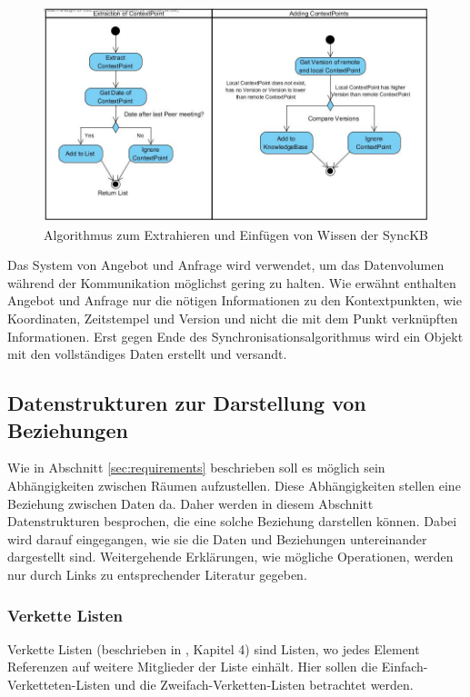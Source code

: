 \documentclass[a4paper]{article}
\begin{document}
	\begin{figure}[H] 
		\includegraphics[width=\linewidth]{../Bilder/sync_flow.jpg}
		\caption{Algorithmus zum Extrahieren und Einfügen von Wissen der SyncKB}
		\label{fig:SyncFlow}
	\end{figure}
	
	Das System von Angebot und Anfrage wird verwendet, um das Datenvolumen während
	der Kommunikation möglichst gering zu halten. Wie erwähnt enthalten Angebot
	und Anfrage nur die nötigen Informationen zu den Kontextpunkten, wie
	Koordinaten, Zeitstempel und Version und nicht die mit dem Punkt verknüpften
	Informationen. Erst gegen Ende des Synchronisationsalgorithmus wird ein 
	Objekt mit den vollständiges Daten erstellt und versandt.
	
	\subsection{Datenstrukturen zur Darstellung von Beziehungen}
	\label{sec:datastruct}
	
	Wie in Abschnitt \ref{sec:requirements} beschrieben soll es möglich sein
	Abhängigkeiten zwischen Räumen aufzustellen. Diese Abhängigkeiten stellen
	eine Beziehung zwischen Daten da. Daher werden in diesem Abschnitt 
	Datenstrukturen besprochen, die eine solche Beziehung darstellen können.
	Dabei wird darauf eingegangen, wie sie die Daten und Beziehungen untereinander
	dargestellt sind. Weitergehende Erklärungen, wie mögliche Operationen, werden
	nur durch Links zu entsprechender Literatur gegeben.
	
	\subsubsection{Verkette Listen}
	
	Verkette Listen (beschrieben in \cite{FundData}, Kapitel 4) sind Listen,
	wo jedes Element Referenzen auf weitere Mitglieder der Liste einhält.
	Hier sollen die Einfach-Verketteten-Listen und die Zweifach-Verketten-Listen
	betrachtet werden.
	
\end{document}

